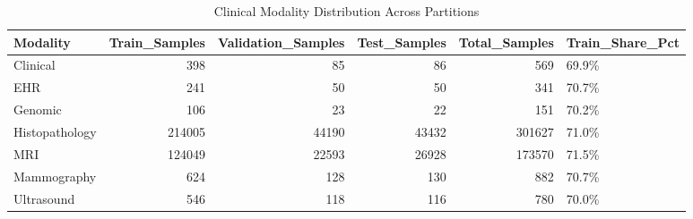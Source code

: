\begin{table}
\caption{Clinical Modality Distribution Across Partitions}
\label{tab:table_modality_distribution}
\begin{tabular}{lrrrrl}
\toprule
Modality & Train\_Samples & Validation\_Samples & Test\_Samples & Total\_Samples & Train\_Share\_Pct \\
\midrule
Clinical & 398 & 85 & 86 & 569 & 69.9\% \\
EHR & 241 & 50 & 50 & 341 & 70.7\% \\
Genomic & 106 & 23 & 22 & 151 & 70.2\% \\
Histopathology & 214005 & 44190 & 43432 & 301627 & 71.0\% \\
MRI & 124049 & 22593 & 26928 & 173570 & 71.5\% \\
Mammography & 624 & 128 & 130 & 882 & 70.7\% \\
Ultrasound & 546 & 118 & 116 & 780 & 70.0\% \\
\bottomrule
\end{tabular}
\end{table}
